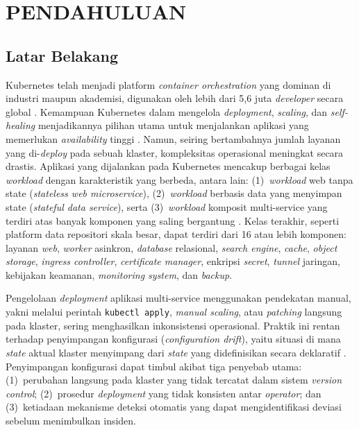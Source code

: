 \chapter{PENDAHULUAN}

\section{Latar Belakang}

Kubernetes telah menjadi platform \textit{container orchestration} yang dominan di industri maupun akademisi, digunakan oleh lebih dari 5,6 juta \textit{developer} secara global \citep{cncf2024}. Kemampuan Kubernetes dalam mengelola \textit{deployment}, \textit{scaling}, dan \textit{self-healing} menjadikannya pilihan utama untuk menjalankan aplikasi yang memerlukan \textit{availability} tinggi \citep{burns2016borg}. Namun, seiring bertambahnya jumlah layanan yang di-\textit{deploy} pada sebuah klaster, kompleksitas operasional meningkat secara drastis. Aplikasi yang dijalankan pada Kubernetes mencakup berbagai kelas \textit{workload} dengan karakteristik yang berbeda, antara lain: (1)~\textit{workload} web tanpa state (\textit{stateless web microservice}), (2)~\textit{workload} berbasis data yang menyimpan state (\textit{stateful data service}), serta (3)~\textit{workload} komposit multi-service yang terdiri atas banyak komponen yang saling bergantung \citep{siddiqui2023microservices, aghili2024workload}. Kelas terakhir, seperti platform data repositori skala besar, dapat terdiri dari 16 atau lebih komponen: layanan \textit{web}, \textit{worker} asinkron, \textit{database} relasional, \textit{search engine}, \textit{cache}, \textit{object storage}, \textit{ingress controller}, \textit{certificate manager}, enkripsi \textit{secret}, \textit{tunnel} jaringan, kebijakan keamanan, \textit{monitoring system}, dan \textit{backup}.

Pengelolaan \textit{deployment} aplikasi multi-service menggunakan pendekatan manual, yakni melalui perintah \texttt{kubectl apply}, \textit{manual scaling}, atau \textit{patching} langsung pada klaster, sering menghasilkan inkonsistensi operasional. Praktik ini rentan terhadap penyimpangan konfigurasi (\textit{configuration drift}), yaitu situasi di mana \textit{state} aktual klaster menyimpang dari \textit{state} yang didefinisikan secara deklaratif \citep{zhang2026configuration}. Penyimpangan konfigurasi dapat timbul akibat tiga penyebab utama: (1)~perubahan langsung pada klaster yang tidak tercatat dalam sistem \textit{version control}; (2)~prosedur \textit{deployment} yang tidak konsisten antar \textit{operator}; dan (3)~ketiadaan mekanisme deteksi otomatis yang dapat mengidentifikasi deviasi sebelum menimbulkan insiden.

